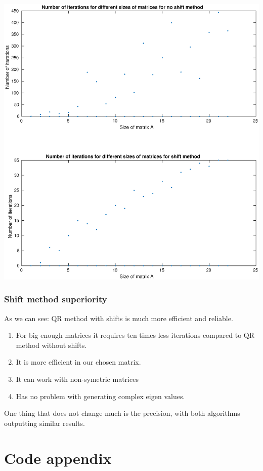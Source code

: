 \documentclass[12pt]{report}
\begin{document}
\begin{center}
   \includegraphics[scale=0.5]{task4plot.eps}
\end{center}
\subsection{Shift method superiority}
As we can see:
QR method with shifts is much more efficient and reliable.
\begin{enumerate}
\item For big enough matrices it requires ten times less iterations compared to QR method without shifts.
\item It is more efficient in our chosen matrix.
\item It can work with non-symetric matrices
\item Has no problem with generating complex eigen values.
\end{enumerate}
 One thing that does not change much is the precision, with both algorithms outputting similar results.







\chapter{Code appendix}
\end{document}
